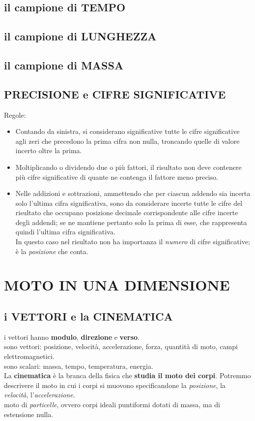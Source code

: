 \documentclass{article}
\begin{document}
		\subsection{il campione di TEMPO}
		\subsection{il campione di LUNGHEZZA}
		\subsection{il campione di MASSA}

		\subsection{PRECISIONE e CIFRE SIGNIFICATIVE}
			Regole:
			\begin{itemize}
\item Contando da sinistra, si considerano significative tutte le cifre significative agli zeri che precedono la prima cifra non nulla, troncando quelle di valore incerto oltre la prima.
\item Moltiplicando o dividendo due o più fattori, il risultato non deve contenere più cifre significative di quante ne contenga il fattore meno preciso.
\item Nelle addizioni e sottrazioni, ammettendo che per ciascun addendo sia incerta solo l'ultima cifra significativa, sono da considerare incerte tutte le cifre del risultato che occupano posizione decimale corrispondente alle cifre incerte degli addendi; se ne mantiene pertanto solo la prima di esse, che rappresenta quindi l'ultima cifra significativa. \\
In questo caso nel risultato non ha importanza il \textit{numero} di cifre significative; è la \textit{posizione} che conta.
			\end{itemize}

	\section{MOTO IN UNA DIMENSIONE}

		\subsection{i VETTORI e la CINEMATICA}
			i vettori hanno \textbf{modulo}, \textbf{direzione} e \textbf{verso}. \\
			sono vettori: posizione, velocità, accelerazione, forza, quantità di moto, campi elettromagnetici. \\
			sono scalari: massa, tempo, temperatura, energia. \\
			La \textbf{cinematica} è la branca della fisica che \textbf{studia il moto dei corpi}.
			Potremmo descrivere il moto in cui i corpi si muovono specificandone la \textit{posizione}, la \textit{velocità}, l'\textit{accelerazione}. \\
			moto di \textit{particelle}, ovvero corpi ideali puntiformi dotati di massa, ma di estensione nulla.
\end{document}
